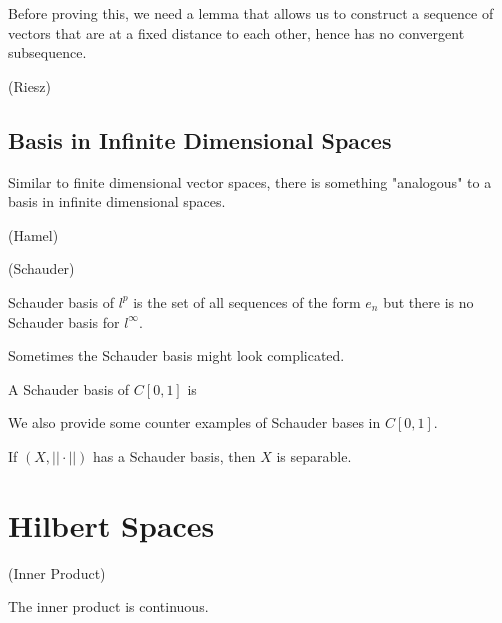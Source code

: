 \documentclass{article}
\begin{document}
Before proving this, we need a lemma that allows us to construct a sequence of vectors
that are at a fixed distance to each other, hence has no convergent subsequence.  

\begin{lemma}
    (Riesz)
\end{lemma}

\subsection{Basis in Infinite Dimensional Spaces}  

Similar to finite dimensional vector spaces, there is something "analogous" to 
a basis in infinite dimensional spaces.  

\begin{defn}
    (Hamel)
\end{defn}  

\begin{defn}
    (Schauder)
\end{defn}   

\begin{eg}
    Schauder basis of $l^p$ is the set of all sequences of the form $e_n$ but there is no 
    Schauder basis for $l^{\infty}$.  
\end{eg}  

Sometimes the Schauder basis might look complicated.    
\begin{eg}
    A Schauder basis of $C[0,1]$ is
\end{eg}  

We also provide some counter examples of Schauder bases in $C[0,1]$.  

\begin{eg}

\end{eg}

\begin{thm}
    If $(X, ||\cdot||)$ has a Schauder basis, then $X$ is separable.  
\end{thm}  



\section{Hilbert Spaces}  

\begin{defn}
    (Inner Product)
\end{defn}  

\begin{remark}
    The inner product is continuous.  
\end{remark}
\end{document}
